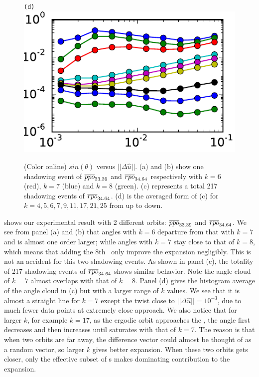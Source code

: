 \documentclass[prl,aps,preprint,showpacs]{revtex4-1} %
\begin{document}
\begin{figure}[h]
\begin{minipage}{.23\textwidth}
  \end{minipage}
  \begin{minipage}{.23\textwidth}
    \centering \small{\texttt{(d)}}
    \includegraphics[width=\textwidth]{rpo4manyAverage}
  \end{minipage}
  \caption{
    (Color online) $sin(\theta)$ versus $||\Delta \hat{u}||$.
    (a) and (b) show one shadowing event of ${\overline{ppo}}_{33.39}$
    and  ${\overline{rpo}}_{34.64}$ respectively
    with  $k=6$ (red), $k=7$ (blue) and $k=8$ (green).
    (c) represents a total 217 shadowing events of
    ${\overline{rpo}}_{34.64}$. (d) is the averaged form of (c) for
    $k=4, 5, 6, 7, 9, 11, 17, 21, 25$ from up to down.
  }
  \label{fig:shadow}
\end{figure}

 shows our experimental result with
2 different orbits: ${\overline{ppo}}_{33.39}$
and ${\overline{rpo}}_{34.64}$. We see from panel (a) and (b) that
angles with $k=6$ departure from that with $k=7$ and is
almost one order larger; while angles with $k=7$ stay close
to that of $k=8$, which means that adding the $8$th \Fv\
only improve the expansion negligibly. This is not an accident
for this two shadowing events. As shown in panel (c), the
totality of 217 shadowing events of ${\overline{rpo}}_{34.64}$
shows similar
behavior. Note the angle cloud of $k=7$ almost overlaps with that
of $k=8$. Panel (d) gives the histogram average of the angle
cloud in (c) but with a larger range of $k$ values. We see that
it is almost a straight line for $k=7$ except the twist close to
$||\Delta \hat{u}|| = 10^{-3}$, due to much fewer data points
at extremely close approach. We also notice that for larger
$k$, for example $k=17$, as the ergodic orbit approaches the \po, the
angle first decreases and then increases until saturates with that of
$k=7$. The reason is that when two orbits
are far away, the difference vector could almost be thought of as a
random vector, so larger $k$ gives better expansion. When these two
orbits gets closer, only the effective subset of \Fv s makes dominating
contribution to the expansion.
\end{document}
